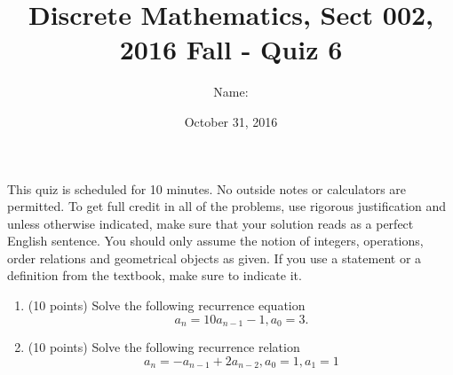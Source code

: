 \documentclass[11pt]{preprint}
\title{Discrete Mathematics, Sect 002, 2016 Fall - Quiz 6}
\author{Name:}
\institute{Courant Institute of Mathematical Sciences, NYU}
\date{October 31, 2016}
\begin{document}
\maketitle

This quiz is scheduled for 10 minutes. No outside notes or calculators are permitted. To get full credit  in all of the problems, use rigorous justification and unless otherwise indicated, make sure that your solution reads as a perfect English sentence. You should only assume the notion of integers, operations, order relations and geometrical objects as given. If you use a statement or a definition from the textbook, make sure to indicate it.
\vspace{0.2cm}

\begin{enumerate}

\item (10 points)  Solve the following recurrence equation
\[
a_n=10a_{n-1}-1, a_0=3.
\]
\vspace{5cm}

\item(10 points) Solve the following recurrence relation
\[
a_n=-a_{n-1}+2a_{n-2}, a_0=1, a_1=1
\]

\end{enumerate}
\end{document}
